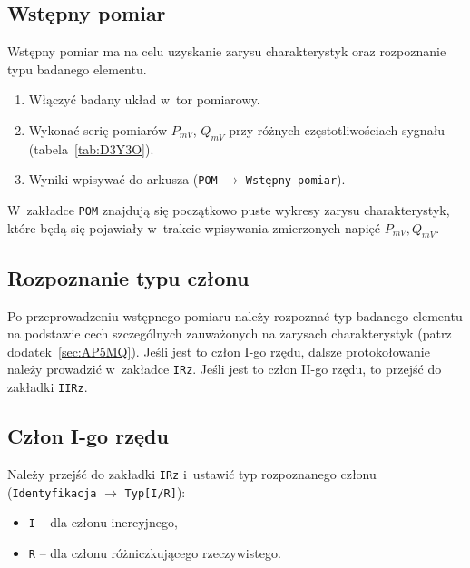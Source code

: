 \documentclass[paper=a4,DIV=12]{lpas}
\begin{document}
\subsection{Wstępny pomiar}
\label{sec:NU1XH}

Wstępny pomiar ma na celu uzyskanie zarysu charakterystyk oraz rozpoznanie typu
badanego elementu.
\begin{enumerate}
  \item Włączyć badany układ w~tor pomiarowy.
  \item Wykonać serię pomiarów $P_{mV}$, $Q_{mV}$ przy różnych
    częstotliwościach sygnału (tabela~\ref{tab:D3Y3O}).
  \item Wyniki wpisywać do arkusza (\texttt{POM} $\rightarrow$ \texttt{Wstępny pomiar}).
\end{enumerate}
W~zakładce \texttt{POM} znajdują się początkowo puste wykresy zarysu
charakterystyk, które będą się pojawiały w~trakcie wpisywania zmierzonych
napięć $P_{mV}, Q_{mV}$.

\subsection{Rozpoznanie typu członu}
\label{sec:NVX7M}

Po przeprowadzeniu wstępnego pomiaru należy rozpoznać typ badanego elementu na
podstawie cech szczególnych zauważonych na zarysach charakterystyk
(patrz dodatek~\ref{sec:AP5MQ}). Jeśli jest to człon I-go rzędu, dalsze
protokołowanie należy prowadzić w~zakładce \texttt{IRz}. Jeśli jest to człon
II-go rzędu, to przejść do zakładki \texttt{IIRz}.

\subsection{Człon I-go rzędu}
\label{sec:3Q2SV}

Należy przejść do zakładki \texttt{IRz} i~ustawić typ rozpoznanego członu
(\texttt{Identyfikacja} $\rightarrow$ \texttt{Typ[I/R]}):
\begin{itemize}
  \item \texttt{I} -- dla członu inercyjnego,
  \item \texttt{R} -- dla członu różniczkującego rzeczywistego.
\end{itemize}
\end{document}
